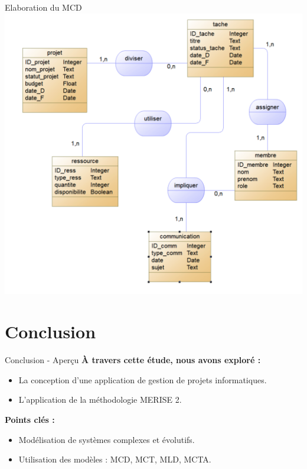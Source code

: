 \documentclass{beamer}
\begin{document}
\begin{frame}{Elaboration du MCD}
    \centering
    \hypertarget{fig8}{\includegraphics[width=\textwidth, height=0.8\textheight, keepaspectratio]{mcd.png}}
    \caption{Fig. Schema du MCD}
\end{frame}

\section{Conclusion}

\begin{frame}{Conclusion - Aperçu}
    \textbf{À travers cette étude, nous avons exploré :}
    \begin{itemize}
        \item La conception d'une application de gestion de projets informatiques.
        \item L'application de la méthodologie MERISE 2.
    \end{itemize}
    \vspace{0.5cm}
    \textbf{Points clés :}
    \begin{itemize}
        \item Modélisation de systèmes complexes et évolutifs.
        \item Utilisation des modèles : MCD, MCT, MLD, MCTA.
    \end{itemize}
\end{frame}
\end{document}
